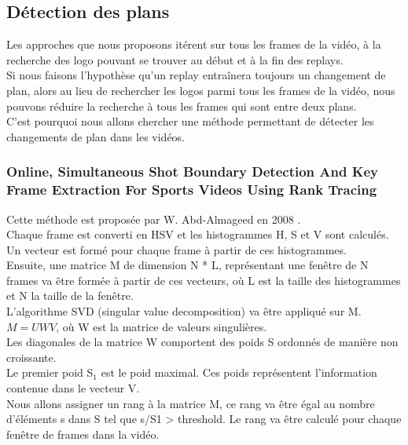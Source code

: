 \documentclass[11pt]{article}
\begin{document}
\subsection{Détection des plans}
\label{sec:org933e647}
Les approches que nous proposons itérent sur tous les frames de la vidéo, à la recherche des logo pouvant se trouver au début et à la fin des replays.\\
Si nous faisons l'hypothèse qu'un replay entraînera toujours un changement de plan, alors au lieu de rechercher les logos parmi tous les frames de la vidéo, nous pouvons réduire la recherche à tous les frames qui sont entre deux plans.\\

C'est pourquoi nous allons chercher une méthode permettant de détecter les changements de plan dans les vidéos.\\

\subsubsection{Online, Simultaneous Shot Boundary Detection And Key Frame Extraction For Sports Videos Using Rank Tracing}
\label{sec:org9ff91a1}
Cette méthode est proposée par W. Abd-Almageed en 2008 \cite{Abd_Almageed_2008}.\\

Chaque frame est converti en HSV et les histogrammes H, S et V sont calculés.\\
Un vecteur est formé pour chaque frame à partir de ces histogrammes.\\
Ensuite, une matrice M de dimension N * L, représentant une fenêtre de N frames va être formée à partir de ces vecteurs, où L est la taille des histogrammes et N la taille de la fenêtre.\\

L'algorithme SVD (singular value decomposition) va être appliqué sur M.  \(M = UWV\), où W est la matrice de valeurs singulières.\\

Les diagonales de la matrice W comportent des poids S ordonnés de manière non croissante.\\
Le premier poid S\(_{\text{1}}\) est le poid maximal. Ces poids représentent l'information contenue dans le vecteur V.\\

Nous allons assigner un rang à la matrice M,  ce rang va être égal au nombre d'éléments s dans S tel que s/S1 > threshold. Le rang va être calculé pour chaque fenêtre de frames dans la vidéo.\\
\end{document}
